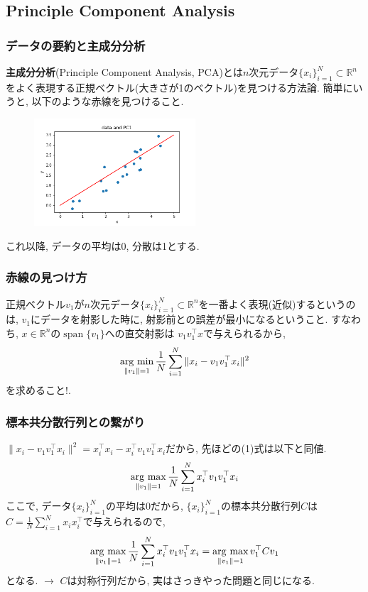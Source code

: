 \documentclass[dvipdfmx,11pt]{beamer}		%
\newcommand{\R}{\mathbb{R}}
\newcommand{\argmax}{\mathop{\rm arg~max}\limits}
\newcommand{\argmin}{\mathop{\rm arg~min}\limits}
\begin{document}
    \subsection{Principle Component Analysis}
    \begin{frame}
        \frametitle{データの要約と主成分分析}
        \textbf{主成分分析}(Principle Component Analysis, PCA)とは$n$次元データ$\{x_i\}_{i = 1}^{N}\subset\R^n$をよく表現する正規ベクトル(大きさが1のベクトル)を見つける方法論.
        簡単にいうと, 以下のような赤線を見つけること.
        \begin{figure}
            \includegraphics[width=6.0cm]{Images/data_pc1.png}
        \end{figure}
        これ以降, データの平均は0, 分散は1とする. 
    \end{frame}
    \begin{frame}
        \frametitle{赤線の見つけ方}
        正規ベクトル$v_1$が$n$次元データ$\{x_i\}_{i = 1}^{N}\subset\R^n$を一番よく表現(近似)するというのは, 
        $v_1$にデータを射影した時に, 射影前との誤差が最小になるということ. 
        すなわち, $x\in\R^n$の$\operatorname{span}\{v_1\}$への直交射影は
        $v_1v_1^{\top}x$で与えられるから, 
        \begin{align}
            \argmin_{\|v_1\| = 1}\frac{1}{N}\sum_{i = 1}^{N}\|x_i - v_1v_1^{\top}x_i\|^2
        \end{align}
        を求めること!. 
    \end{frame}
    \begin{frame}
        \frametitle{標本共分散行列との繋がり}
        $\|x_i - v_1v_1^{\top}x_i\|^2 = x_i^{\top}x_i - x_i^\top v_1v_1^\top x_i$だから, 先ほどの(1)式は以下と同値.
        \begin{align}
            \argmax_{\|v_1\| = 1}\frac{1}{N}\sum_{i = 1}^{N}x_i^\top v_1v_1^\top x_i
        \end{align}
        ここで, データ$\{x_i\}_{i = 1}^{N}$の平均は0だから, $\{x_i\}_{i = 1}^{N}$の標本共分散行列$C$は
        $C = \frac{1}{N}\sum_{i = 1}^{N}x_ix_i^\top$で与えられるので, 
        \begin{align*}
            \argmax_{\|v_1\| = 1}\frac{1}{N}\sum_{i = 1}^{N}x_i^\top v_1v_1^\top x_i = \argmax_{\|v_1\| = 1}v_1^{\top}Cv_1
        \end{align*}
        となる. $\to$ $C$は対称行列だから, 実はさっきやった問題と同じになる.
    \end{frame}
\end{document}
